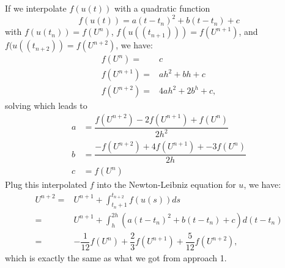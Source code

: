 \documentclass[11pt]{article}
\begin{document}
\maketitle
\pagebreak

\section{}
\subsection{}

\subsection{}
If we interpolate $f(u(t))$ with a quadratic function
\begin{equation}
    f(u(t)) = a(t-t_n)^2 + b(t-t_n) + c
\end{equation} 
with $f(u(t_n))=f(U^n)$, $f(u((t_{n+1}))) = f(U^{n+1})$, and 
$f(u((t_{n+2})) = f(U^{n+2})$, we have:
\begin{equation}\begin{split}
    f(U^n) =& c \\
    f(U^{n+1}) =& ah^2 + bh + c \\
    f(U^{n+2}) =& 4ah^2 + 2b^h + c,
\end{split}\end{equation}
solving which leads to
\begin{equation}\begin{split}
    a &= \dfrac{f(U^{n+2}) - 2f(U^{n+1}) + f(U^n)}{2h^2}\\
    b &= \dfrac{-f(U^{n+2}) + 4f(U^{n+1}) + -3f(U^n)}{2h}\\
    c &= f(U^n)
\end{split}\end{equation} 
Plug this interpolated $f$ into the Newton-Leibniz equation for $u$, we have:
\begin{equation}\begin{split}
    U^{n+2}=&U^{n+1}+\int_{t_n+1}^{t_{n+2}}f(u(s))ds\\
           =&U^{n+1}+\int_h^{2h}(a(t-t_n)^2+b(t-t_n)+c)d(t-t_n)\\
           =&-\dfrac1{12}f(U^{n}) + \dfrac23f(U^{n+1}) + \dfrac5{12}f(U^{n+2}),
\end{split}\end{equation}
which is exactly the same as what we got from approach 1.
\end{document}
